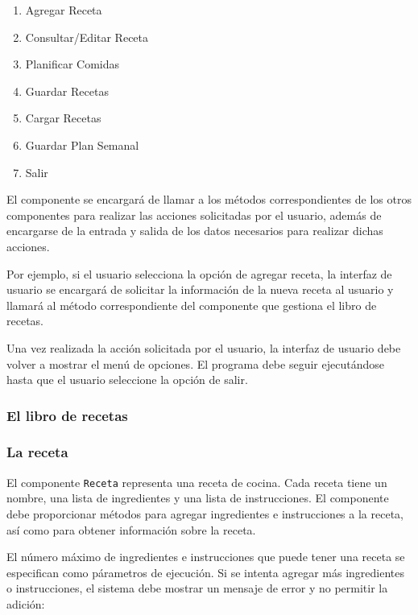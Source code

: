 \documentclass[
    a4paper, %
    12pt, %
]{CSSullivanBusinessReport}
\begin{document}
\begin{enumerate}
    \item Agregar Receta
    \item Consultar/Editar Receta
    \item Planificar Comidas
    \item Guardar Recetas
    \item Cargar Recetas
    \item Guardar Plan Semanal
    \item Salir
\end{enumerate}

El componente se encargará de llamar a los métodos correspondientes de los otros componentes para realizar las acciones solicitadas por el usuario, además de encargarse de la entrada y salida de los datos necesarios para realizar dichas acciones.

Por ejemplo, si el usuario selecciona la opción de agregar receta, la interfaz de usuario se encargará de solicitar la información de la nueva receta al usuario y llamará al método correspondiente del componente que gestiona el libro de recetas.

Una vez realizada la acción solicitada por el usuario, la interfaz de usuario debe volver a mostrar el menú de opciones. El programa debe seguir ejecutándose hasta que el usuario seleccione la opción de salir.

\subsubsection{El libro de recetas}

\subsubsection{La receta}\label{sec:receta}

El componente \texttt{Receta} representa una receta de cocina. Cada receta tiene un nombre, una lista de ingredientes y una lista de instrucciones. El componente debe proporcionar métodos para agregar ingredientes e instrucciones a la receta, así como para obtener información sobre la receta.

El número máximo de ingredientes e instrucciones que puede tener una receta se especifican como párametros de ejecución. Si se intenta agregar más ingredientes o instrucciones, el sistema debe mostrar un mensaje de error y no permitir la adición:
\end{document}

